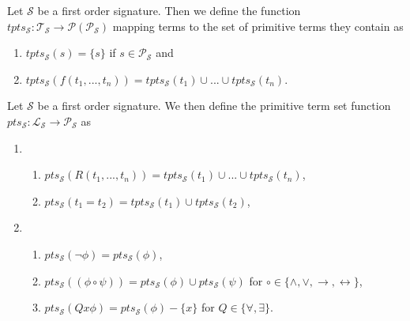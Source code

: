 \begin{definition}\label{def:terms-pt-set}
    Let $\mathcal{S}$ be a first order signature. Then we define the function $tpts_{\mathcal{S}} : \mathcal{T}_{\mathcal{S}} \to \mathcal{P}(\mathcal{P}_{\mathcal{S}})$ mapping terms to the set of primitive terms they contain as
    \begin{enumerate}
        \item $tpts_{\mathcal{S}}(s) = \{s\}$ if $s \in \mathcal{P}_{\mathcal{S}}$ and
        \item $tpts_{\mathcal{S}}(f(t_1,...,t_n)) = tpts_{\mathcal{S}}(t_1)\cup ... \cup tpts_{\mathcal{S}}(t_n)$.
    \end{enumerate}
\end{definition}

\begin{definition}\label{FO-term-set}
    Let $\mathcal{S}$ be a first order signature. We then define the primitive term set function $pts_{\mathcal{S}} : \mathcal{L}_{\mathcal{S}} \to \mathcal{P}_{\mathcal{S}}$ as 
    \begin{enumerate}
        \item \begin{enumerate}
            \item $pts_{\mathcal{S}}(R(t_1,...,t_n)) = tpts_{\mathcal{S}}(t_1) \cup ... \cup tpts_{\mathcal{S}}(t_n)$,
            \item $pts_{\mathcal{S}}(t_1 = t_2) = tpts_{\mathcal{S}}(t_1) \cup tpts_{\mathcal{S}}(t_2)$,
        \end{enumerate}
        \item \begin{enumerate}
            \item $pts_{\mathcal{S}}(\neg \phi) = pts_{\mathcal{S}}(\phi)$,
            \item $pts_{\mathcal{S}}((\phi \circ \psi)) = pts_{\mathcal{S}}(\phi) \cup pts_{\mathcal{S}}(\psi)$ for $\circ \in \{\land, \lor, \to, \leftrightarrow\}$,
            \item $pts_{\mathcal{S}}(Qx\phi) = pts_{\mathcal{S}}(\phi) - \{x\}$ for $Q \in \{\forall, \exists\}$.
        \end{enumerate}
    \end{enumerate}
\end{definition}

